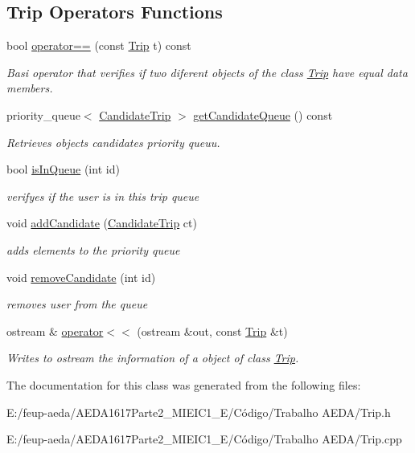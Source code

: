 \subsection*{Trip Operators Functions}
\begin{DoxyCompactItemize}
\item 
bool \hyperlink{group___trip_ga1462791c70b237e595244b16e086850f}{operator==} (const \hyperlink{class_trip}{Trip} t) const
\begin{DoxyCompactList}\small\item\em Basi operator that verifies if two diferent objects of the class \hyperlink{class_trip}{Trip} have equal data members. \end{DoxyCompactList}\item 
priority\+\_\+queue$<$ \hyperlink{class_candidate_trip}{Candidate\+Trip} $>$ \hyperlink{group___trip_ga1c016b992e17387a25ec9f7e545a6594}{get\+Candidate\+Queue} () const
\begin{DoxyCompactList}\small\item\em Retrieves object\textquotesingle{}s candidates priority queuu. \end{DoxyCompactList}\item 
bool \hyperlink{group___trip_gaa704cf099858e8de479f6fdd6229008f}{is\+In\+Queue} (int id)
\begin{DoxyCompactList}\small\item\em verifyes if the user is in this trip queue \end{DoxyCompactList}\item 
void \hyperlink{group___trip_ga6879d39109d9b024461c9edb58c8b1dd}{add\+Candidate} (\hyperlink{class_candidate_trip}{Candidate\+Trip} ct)
\begin{DoxyCompactList}\small\item\em adds elements to the priority queue \end{DoxyCompactList}\item 
void \hyperlink{group___trip_ga5c0fbf9c2320dc4799896295788eff9e}{remove\+Candidate} (int id)
\begin{DoxyCompactList}\small\item\em removes user from the queue \end{DoxyCompactList}\item 
ostream \& \hyperlink{group___trip_gaeae00f4e739b064d8261c91d62cde34a}{operator$<$$<$} (ostream \&out, const \hyperlink{class_trip}{Trip} \&t)
\begin{DoxyCompactList}\small\item\em Writes to ostream the information of a object of class \hyperlink{class_trip}{Trip}. \end{DoxyCompactList}\end{DoxyCompactItemize}


The documentation for this class was generated from the following files\+:\begin{DoxyCompactItemize}
\item 
E\+:/feup-\/aeda/\+A\+E\+D\+A1617\+Parte2\+\_\+M\+I\+E\+I\+C1\+\_\+\+E/\+Código/\+Trabalho A\+E\+D\+A/Trip.\+h\item 
E\+:/feup-\/aeda/\+A\+E\+D\+A1617\+Parte2\+\_\+M\+I\+E\+I\+C1\+\_\+\+E/\+Código/\+Trabalho A\+E\+D\+A/Trip.\+cpp\end{DoxyCompactItemize}
